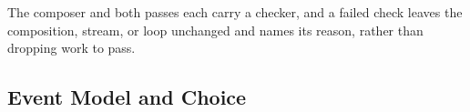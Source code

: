 The composer and both passes each carry a checker, and a failed check leaves the composition, stream, or loop unchanged and names its reason, rather than dropping work to pass.

\subsection{Event Model and Choice}
\label{subsec:pricing}

